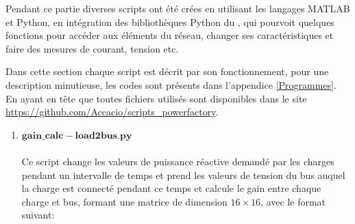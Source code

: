 Pendant ce partie diverses scripts ont été crées en utilisant les langages MATLAB et Python, en intégration des bibliothèques Python du \powerfactory, qui pourvoit quelques fonctions pour accéder aux éléments du réseau, changer ses caractéristiques et faire des mesures de courant, tension etc.

Dans cette section chaque script est décrit par son fonctionnement, pour une description minutieuse, les codes sont présents dans l'appendice \ref{Programmes}. En ayant en tête que toutes fichiers utilisés sont disponibles dans le site \url{https://github.com/Accacio/scripts_powerfactory}.



\begin{enumerate}[\bfseries 4.3.1]
	\item $\mathbf{gain\_calc-load2bus.py}$\\
	\\Ce script change les valeurs de puissance réactive demandé par les charges pendant un intervalle de temps et prend les valeurs de tension du bus auquel la charge est connecté pendant ce temps et calcule le gain entre chaque charge et bus, formant une matrice de dimension $ 16\times16 $, avec le format suivant:
	\\	\begin{table}[H]\tiny
		\captionsetup{justification=centering,margin=0cm}
		\caption{Matrice des Gain de sortie du script $gain\_calc-load2bus.py$.}
		\centering
\end{table}
\end{enumerate}
